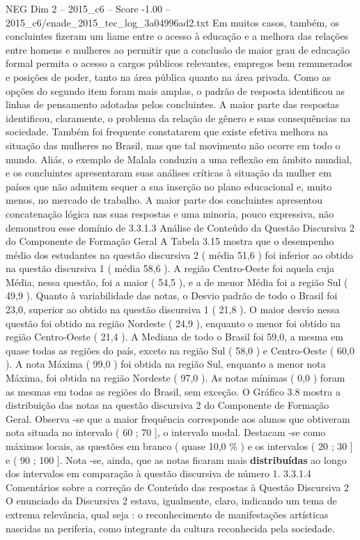 \begin{textsample}{NEG Dim 2 – 2015\_c6 – Score -1.00 – 2015\_c6/enade\_2015\_tec\_log\_3a04996ad2.txt}
Em muitos casos, também, os concluintes fizeram um liame entre o acesso à educação e a melhora das relações entre homens e mulheres ao permitir que a conclusão de maior grau de educação formal permita o acesso a cargos públicos relevantes, empregos bem remunerados e posições de poder, tanto na área pública quanto na área privada.
Como as opções do segundo item foram mais amplas, o padrão de resposta identificou as linhas de pensamento adotadas pelos concluintes.
A maior parte das respostas identificou, claramente, o problema da relação de gênero e suas consequências na sociedade.
Também foi frequente constatarem que existe efetiva melhora na situação das mulheres no Brasil, mas que tal movimento não ocorre em todo o mundo.
Aliás, o exemplo de Malala conduziu a uma reflexão em âmbito mundial, e os concluintes apresentaram suas análises críticas à situação da mulher em países que não admitem sequer a sua inserção no plano educacional e, muito menos, no mercado de trabalho.
A maior parte dos concluintes apresentou concatenação lógica nas suas respostas e uma minoria, pouco expressiva, não demonstrou esse domínio de 3.3.1.3 Análise de Conteúdo da Questão Discursiva 2 do Componente de Formação Geral A Tabela 3.15 mostra que o desempenho médio dos estudantes na questão discursiva 2 ( média 51,6 ) foi inferior ao obtido na questão discursiva 1 ( média 58,6 ).
A região Centro-Oeste foi aquela cuja Média, nessa questão, foi a maior ( 54,5 ), e a de menor Média foi a região Sul ( 49,9 ).
Quanto à variabilidade das notas, o Desvio padrão de todo o Brasil foi 23,0, superior ao obtido na questão discursiva 1 ( 21,8 ).
O maior desvio nessa questão foi obtido na região Nordeste ( 24,9 ), enquanto o menor foi obtido na região Centro-Oeste ( 21,4 ).
A Mediana de todo o Brasil foi 59,0, a mesma em quase todas as regiões do país, exceto na região Sul ( 58,0 ) e Centro-Oeste ( 60,0 ).
A nota Máxima ( 99,0 ) foi obtida na região Sul, enquanto a menor nota Máxima, foi obtida na região Nordeste ( 97,0 ).
As notas mínimas ( 0,0 ) foram as mesmas em todas as regiões do Brasil, sem exceção.
O Gráfico 3.8 mostra a distribuição das notas na questão discursiva 2 do Componente de Formação Geral.
Observa -se que a maior frequência corresponde aos alunos que obtiveram nota situada no intervalo ( 60 ; 70 ], o intervalo modal.
Destacam -se como máximos locais, as questões em branco ( quase 10,0 \% ) e os intervalos ( 20 ; 30 ] e ( 90 ; 100 ].
Nota -se, ainda, que as notas ficaram mais \textbf{distribuídas} ao longo dos intervalos em comparação à questão discursiva de número 1. 3.3.1.4 Comentários sobre a correção de Conteúdo das respostas à Questão Discursiva 2 O enunciado da Discursiva 2 estava, igualmente, claro, indicando um tema de extrema relevância, qual seja : o reconhecimento de manifestações artísticas nascidas na periferia, como integrante da cultura reconhecida pela sociedade.

\end{textsample}
